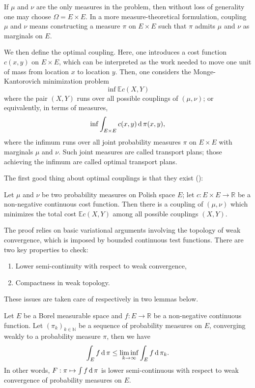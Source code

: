 If \( \mu \) and \( \nu \) are the only measures in the problem,
then without loss of generality one may choose \( \Omega = E \times E .
\) In a more measure-theoretical formulation,
coupling \( \mu \) and \( \nu \) means constructing a measure \( \pi \) on \( E \times E \) such that \( \pi \) admits \( \mu \) and \( \nu \) as marginals on \( E \).

We then define the optimal coupling.
Here, one introduces a cost function \( c ( x , y ) \) on \( E \times E \),
which can be interpreted as the work needed to move one unit of mass from location \( x \) to location \( y \).
Then, one considers the Monge-Kantorovich minimization problem
\[
	\inf  \mathbb{ E } c ( X , Y )
\]
where the pair \( ( X , Y ) \) runs over all possible couplings of \( ( \mu , \nu ) \);
or equivalently, in terms of measures,
\[ \inf \int _ { E \times E } c ( x , y ) \operatorname{d} \pi ( x , y ), \]
where the infimum runs over all joint probability measures \( \pi \) on \( E \times E \) with marginals \( \mu \) and \( \nu \).
Such joint measures are called transport plans;
those achieving the infimum are called optimal transport plans.

The first good thing about optimal couplings is that they exist (\cite[Theorem 4.1]{villani2008optimal}):
\begin{thm}
	\label{thm:existence_optimal_coupling}
	Let \(  \mu \) and \(  \nu  \) be two probability measures on Polish space $E$;
	let \( c: E \times E \rightarrow \mathbb{ R }  \) be
	a non-negative continuous cost function.
	Then there is a coupling of \( ( \mu , \nu ) \) which minimizes the total cost \( \mathbb{ E } c ( X , Y ) \) among all possible couplings \( ( X , Y ) \).
\end{thm}

The proof relies on basic variational arguments involving the topology of weak convergence,
which is imposed by bounded continuous test functions.
There are two key properties to check:
\begin{enumerate}
	\item Lower semi-continuity with respect to weak convergence,
	\item Compactness in weak topology.
\end{enumerate}
These issues are taken care of respectively in two lemmas below.

\begin{lem}
	\label{lem:lower_semi-continuity_of_the_cost_functional}
	Let \( E \) be a Borel measurable space
	and \( f : E  \rightarrow \mathbb{ R }\) be a non-negative continuous function.
	Let \( \left( \pi _ { k } \right) _ { k \in \mathbb{ N } } \) be a sequence of
	probability measures on \( E \),
	converging weakly to a probability measure \( \pi \),
	then we have
	\[
		\int _ { E } f \operatorname{d} \pi \leq \liminf _ { k \rightarrow \infty } \int _ { E } f \operatorname{d} \pi _ { k }.
	\]
	In other words, \( F: \pi \mapsto \int f \operatorname{d} \pi \) is lower semi-continuous
	with respect to weak convergence of probability measures on $E$.
\end{lem}

